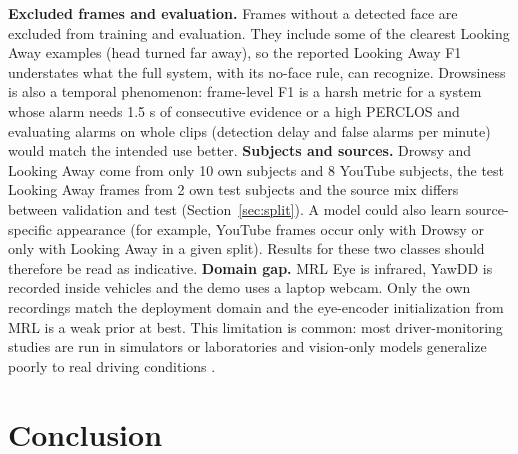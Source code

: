 \documentclass[conference]{IEEEtran}
\begin{document}
\newline
\textbf{Excluded frames and evaluation.} Frames without a detected face are excluded from training and evaluation. They include some of the clearest Looking Away examples (head turned far away), so the reported Looking Away F1 understates what the full system, with its no-face rule, can recognize. Drowsiness is also a temporal phenomenon: frame-level F1 is a harsh metric for a system whose alarm needs 1.5 s of consecutive evidence or a high PERCLOS and evaluating alarms on whole clips (detection delay and false alarms per minute) would match the intended use better.
\newline
\textbf{Subjects and sources.} Drowsy and Looking Away come from only 10 own subjects and 8 YouTube subjects, the test Looking Away frames from 2 own test subjects and the source mix differs between validation and test (Section~\ref{sec:split}). A model could also learn source-specific appearance (for example, YouTube frames occur only with Drowsy or only with Looking Away in a given split). Results for these two classes should therefore be read as indicative.
\newline
\textbf{Domain gap.} MRL Eye is infrared, YawDD is recorded inside vehicles and the demo uses a laptop webcam. Only the own recordings match the deployment domain and the eye-encoder initialization from MRL is a weak prior at best. This limitation is common: most driver-monitoring studies are run in simulators or laboratories \cite{john2024} and vision-only models generalize poorly to real driving conditions \cite{dontoh2025}.



\vspace{0.2cm}
\section{Conclusion}
\end{document}
